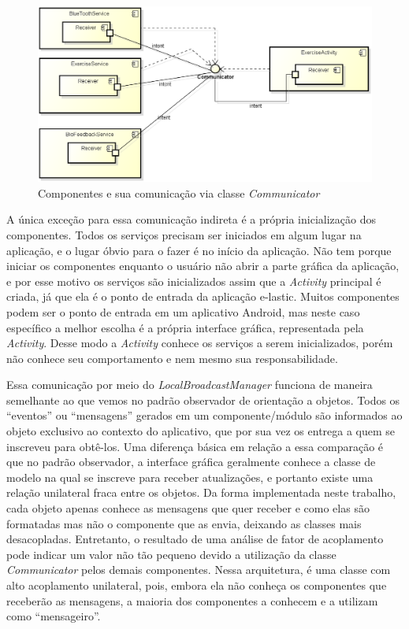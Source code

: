 \begin{figure}[!htb]
\centering
\includegraphics [keepaspectratio=true,scale=0.60]{figuras/diagramaComponentes.eps}
\caption{Componentes e sua comunicação via classe \textit{Communicator}}
\label{diagramaComponentes}
\end{figure}

A única exceção para essa comunicação indireta é a própria inicialização dos componentes. Todos os serviços precisam ser iniciados em algum lugar na aplicação, e o lugar óbvio para o fazer é no início da aplicação. Não tem porque iniciar os componentes enquanto o usuário não abrir a parte gráfica da aplicação, e por esse motivo os serviços são inicializados assim que a \textit{Activity} principal é criada, já que ela é o ponto de entrada da aplicação e-lastic. Muitos componentes podem ser o ponto de entrada em um aplicativo Android, mas neste caso específico a melhor escolha é a própria interface gráfica, representada pela \textit{Activity}. Desse modo a \textit{Activity} conhece os serviços a serem inicializados, porém não conhece seu comportamento e nem mesmo sua responsabilidade.

Essa comunicação por meio do \textit{LocalBroadcastManager} funciona de maneira semelhante ao que vemos no padrão observador de orientação a objetos. Todos os ``eventos'' ou ``mensagens'' gerados em um componente/módulo são informados ao objeto exclusivo ao contexto do aplicativo, que por sua vez os entrega a quem se inscreveu para obtê-los. Uma diferença básica em relação a essa comparação é que no padrão observador, a interface gráfica geralmente conhece a classe de modelo na qual se inscreve para receber atualizações, e portanto existe uma relação unilateral fraca entre os objetos. Da forma implementada neste trabalho, cada objeto apenas conhece as mensagens que quer receber e como elas são formatadas mas não o componente que as envia, deixando as classes mais desacopladas. Entretanto, o resultado de uma análise de fator de acoplamento pode indicar um valor não tão pequeno devido a utilização da classe \textit{Communicator} pelos demais componentes. Nessa arquitetura, é uma classe com alto acoplamento unilateral, pois, embora ela não conheça os componentes que receberão as mensagens, a maioria dos componentes a conhecem e a utilizam como ``mensageiro''. 

